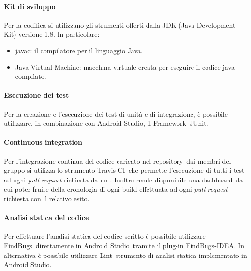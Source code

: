 \documentclass[../NormeProgetto.text]{subfiles}
\begin{document}
			\paragraph{Kit di sviluppo}
				Per la codifica si utilizzano gli strumenti offerti dalla JDK (Java Development Kit\g) versione 1.8. In particolare:
				\begin{itemize}
					\item javac: il compilatore per il linguaggio Java.
					\item Java Virtual Machine: macchina virtuale creata per eseguire il codice java compilato.
				\end{itemize}
 			
 			\paragraph{Esecuzione dei test}
 				Per la creazione e l'esecuzione dei test di unità e di integrazione, è possibile utilizzare, in combinazione con Android Studio\g, il Framework\g\ JUnit\g.
 				
 			\paragraph{Continuous integration}
 				Per l'integrazione continua del codice caricato nel repository\g\ dai membri del gruppo si utilizza lo strumento Travis CI\g\ che permette l'esecuzione di tutti i test ad ogni \textit{pull request} richiesta da un \programmatore. Inoltre rende disponibile una dashboard\g\ da cui poter fruire della cronologia di ogni build effettuata ad ogni \textit{pull request} richiesta con il relativo esito.
 				
 			\paragraph{Analisi statica del codice}
 				Per effettuare l'analisi statica del codice scritto è possibile utilizzare FindBugs\g\ direttamente in Android Studio\g\ tramite il plug-in FindBugs-IDEA. In alternativa è possibile utilizzare Lint\g\, strumento di analisi statica implementato in Android Studio\g.
 			
			
\end{document}
